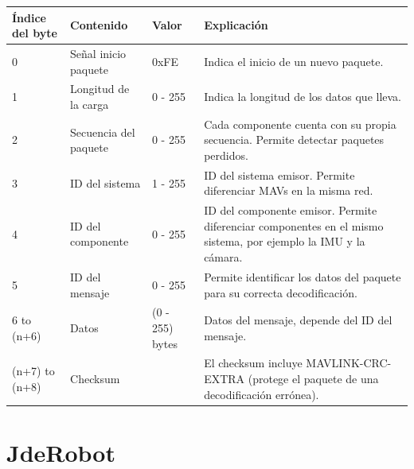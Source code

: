 \begin{center}
	\label{tablaMAVLinkProtocolo}
    \begin{tabular}{ | p{2cm} | p{2cm} | p{3cm} | p{5cm} |}
    \hline
    Índice del byte & Contenido & Valor & Explicación \\ \hline
    0 & Señal inicio paquete & 0xFE  & Indica el inicio de un nuevo paquete. \\ \hline
     1 & Longitud de la carga	& 0 - 255 & Indica la longitud de los datos que lleva. \\ \hline
     2 & Secuencia del paquete & 0 - 255 & Cada componente cuenta con su propia secuencia. Permite detectar paquetes perdidos. \\
    \hline
    3 & ID del sistema & 1 - 255 & ID del sistema emisor. Permite diferenciar MAVs en la misma red. \\
    \hline
    4 & ID del componente & 0 - 255	& ID del componente emisor. Permite diferenciar componentes en el mismo sistema, por ejemplo la IMU y la cámara.\\
    \hline
    5 & ID del mensaje	& 0 - 255 & Permite identificar los datos del paquete para su correcta decodificación.\\
    \hline
     6 to (n+6)  & Datos	& (0 - 255) bytes & Datos del mensaje, depende del ID del mensaje.\\
    \hline
   	(n+7) to (n+8) & Checksum &  & El checksum  incluye MAVLINK-CRC-EXTRA (protege el paquete de una decodificación errónea). \\ 
    \hline
    \end{tabular}
\end{center}



\section{JdeRobot}
\label{sec:jderobot}

